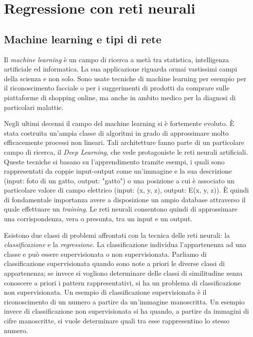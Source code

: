 \documentclass[12pt,a4paper,final]{book}
\begin{document}



\chapter{Regressione con reti neurali}\label{reg_nn}


\section{Machine learning e tipi di rete}
Il \textit{machine learning} è un campo di ricerca a metà tra statistica, intelligenza artificiale ed informatica. La sua applicazione riguarda ormai vastissimi campi della scienza e non solo. Sono usate tecniche di machine learning per esempio per il riconoscimento facciale o per i suggerimenti di prodotti da comprare sulle piattaforme di shopping online, ma anche in ambito medico per la diagnosi di particolari malattie.


Negli ultimi decenni il campo del machine learning si è fortemente evoluto. È stata costruita un'ampia classe di algoritmi in grado di approssimare molto efficacemente processi non lineari. Tali architetture fanno parte di un particolare campo di ricerca, il \textit{Deep Learning}, che vede protagoniste le reti neurali artificiali.
Queste tecniche si basano su l'apprendimento tramite esempi, i quali sono rappresentati da coppie input-output come un'immagine e la sua descrizione (input: foto di un gatto, output: "gatto") o una posizione a cui è associato un particolare valore di campo elettrico (input: (x, y, z), output: E(x, y, z)). È quindi di fondamentale importanza avere a disposizione un ampio database attraverso il quale effettuare un \textit{training}. Le reti neurali consentono quindi di approssimare una corrispondenza, vera o presunta, tra un input e un output. 


Esistono due classi di problemi affrontati con la tecnica delle reti neurali: la \textit{classificazione} e la \textit{regressione}.
La classificazione individua l'appartenenza ad una classe e può essere supervisionata o non supervisionata. Parliamo di classificazione supervisionata quando sono note a priori le diverse classi di appartenenza; se invece si vogliono determinare delle classi di similitudine senza conoscere a priori i pattern rappresentativi, si ha un problema di classificazione non supervisionata.
Un esempio di classificazione supervisionata è il riconoscimento di un numero a partire da un'immagine manoscritta. Un esempio invece di classificazione non supervisionata si ha quando, a partire da immagini di cifre manoscritte, si vuole determinare quali tra esse rappresentino lo stesso numero.
\end{document}
